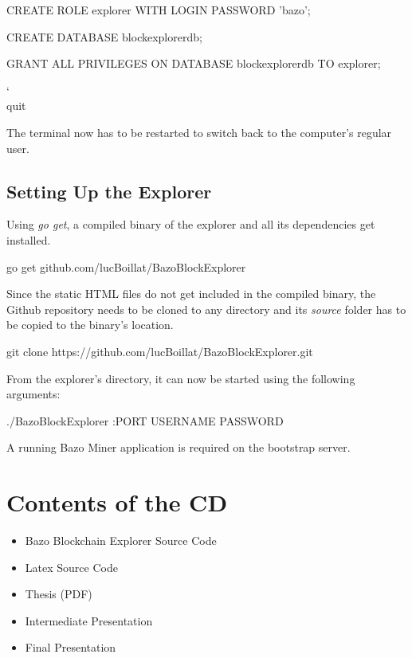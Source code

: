 \begin{framed}
CREATE ROLE explorer WITH LOGIN PASSWORD 'bazo';

CREATE DATABASE blockexplorerdb;

GRANT ALL PRIVILEGES ON DATABASE blockexplorerdb TO explorer;

\char`\\quit
\end{framed}

The terminal now has to be restarted to switch back to the computer's regular user.

\section{Setting Up the Explorer}

Using \emph{go get}, a compiled binary of the explorer and all its dependencies get installed.

\begin{framed}
go get github.com/lucBoillat/BazoBlockExplorer
\end{framed}

Since the static HTML files do not get included in the compiled binary, the Github repository needs to be cloned to any directory and its \emph{source} folder has to be copied to the binary's location.

\begin{framed}
git clone https://github.com/lucBoillat/BazoBlockExplorer.git
\end{framed}

From the explorer's directory, it can now be started using the following arguments:
\begin{framed}
./BazoBlockExplorer :PORT USERNAME PASSWORD
\end{framed}

A running Bazo Miner application is required on the bootstrap server.

\chapter{Contents of the CD}

\begin{itemize}
\item Bazo Blockchain Explorer Source Code
\item Latex Source Code
\item Thesis (PDF)
\item Intermediate Presentation
\item Final Presentation
\end{itemize}